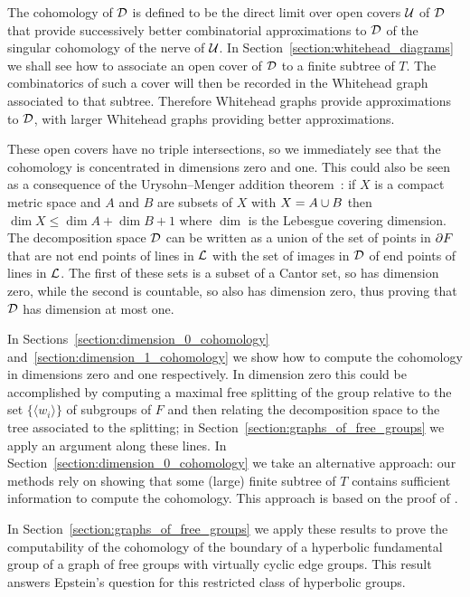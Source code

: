 The \vCech{} cohomology of $\mathcal{D}$ is defined to be the direct limit over open covers $\mathcal{U}$ of $\mathcal{D}$ that provide successively better combinatorial approximations to $\mathcal{D}$ of the singular cohomology of the nerve of $\mathcal{U}$.
In Section~\ref{section:whitehead_diagrams} we shall see how to associate an open cover of $\mathcal{D}$ to a finite subtree of $T$.
The combinatorics of such a cover will then be recorded in the Whitehead graph associated to that subtree.
Therefore Whitehead graphs provide approximations to $\mathcal{D}$, with larger Whitehead graphs providing better approximations.

These open covers have no triple intersections, so we immediately see that the \vCech{} cohomology is concentrated in dimensions zero and one.
This could also be seen as a consequence of the Urysohn--Menger addition theorem~\cite[3.1.17]{engelking78}: if $X$ is a compact metric space and $A$ and $B$ are subsets of $X$ with $X = A \cup B$ then $\dim X \leq \dim A + \dim B + 1$ where $\dim$ is the Lebesgue covering dimension.
The decomposition space $\mathcal{D}$ can be written as a union of the set of points in $\partial F$ that are not end points of lines in $\mathcal{L}$ with the set of images in $\mathcal{D}$ of end points of lines in $\mathcal{L}$.
The first of these sets is a subset of a Cantor set, so has dimension zero, while the second is countable, so also has dimension zero, thus proving that $\mathcal{D}$ has dimension at most one.

In Sections~\ref{section:dimension_0_cohomology} and~\ref{section:dimension_1_cohomology} we show how to compute the \vCech{} cohomology in dimensions zero and one respectively.
In dimension zero this could be accomplished by computing a maximal free splitting of the group relative to the set $\{\langle w_i\rangle\}$ of subgroups of $F$ and then relating the decomposition space to the tree associated to the splitting; in Section~\ref{section:graphs_of_free_groups} we apply an argument along these lines.
In Section~\ref{section:dimension_0_cohomology} we take an alternative approach: our methods rely on showing that some (large) finite subtree of $T$ contains sufficient information to compute the \vCech{} cohomology.
This approach is based on the proof of \cite[Lemma 4.12]{cashenmacura11}.

In Section~\ref{section:graphs_of_free_groups} we apply these results to prove the computability of the \vCech{} cohomology of the boundary of a hyperbolic fundamental group of a graph of free groups with virtually cyclic edge groups.
This result answers Epstein's question for this restricted class of hyperbolic groups.

